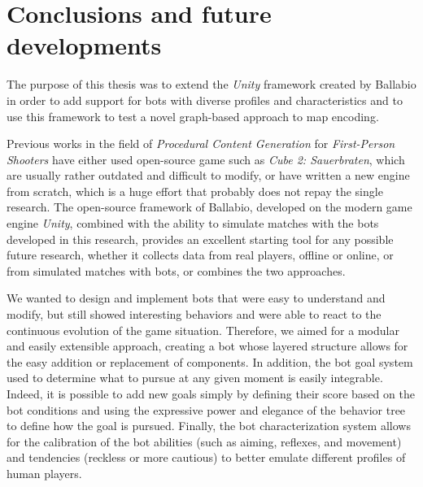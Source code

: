 \documentclass{Configuration_Files/PoliMi3i_thesis}
\begin{document}











\chapter{Conclusions and future developments}
\label{ch:conclusions}%
The purpose of this thesis was to extend the \textit{Unity} framework created by Ballabio \cite{ballabio_framework} in order to add support for bots with diverse profiles and characteristics and to use this framework to test a novel graph-based approach to map encoding. 

Previous works in the field of \textit{Procedural Content Generation} for \textit{First-Person Shooters} have either used open-source game such as \textit{Cube 2: Sauerbraten}, which are usually rather outdated and difficult to modify, or have written a new engine from scratch, which is a huge effort that probably does not repay the single research. 
The open-source framework of Ballabio, developed on the modern game engine \textit{Unity}, combined with the ability to simulate matches with the bots developed in this research, provides an excellent starting tool for any possible future research, whether it collects data from real players, offline or online, or from simulated matches with bots, or combines the two approaches.

We wanted to design and implement bots that were easy to understand and modify, but still showed interesting behaviors and were able to react to the continuous evolution of the game situation. Therefore, we aimed for a modular and easily extensible approach, creating a bot whose layered structure allows for the easy addition or replacement of components. In addition, the bot goal system used to determine what to pursue at any given moment is easily integrable. Indeed, it is possible to add new goals simply by defining their score based on the bot conditions and using the expressive power and elegance of the behavior tree to define how the goal is pursued. Finally, the bot characterization system allows for the calibration of the bot abilities (such as aiming, reflexes, and movement) and tendencies (reckless or more cautious) to better emulate different profiles of human players.
\end{document}
